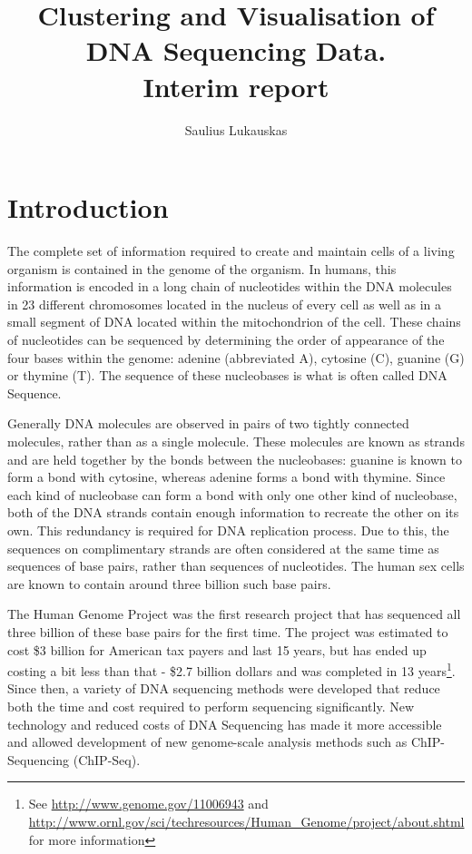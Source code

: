 \documentclass[12pt,a4paper]{article}
\begin{document}
\title{Clustering and Visualisation of DNA Sequencing Data.\\Interim report}
\author{Saulius Lukauskas}
\date{}
\maketitle

\section{Introduction}

The complete set of information required to create and maintain cells of a
living organism is contained in the genome of the organism. In humans, this
information is encoded in a long chain of nucleotides within the DNA molecules
in 23 different chromosomes located in the nucleus of every cell as well as in
a small segment of DNA located within the mitochondrion of the cell.  These
chains of nucleotides can be sequenced by determining the order of appearance
of the four bases within the genome: adenine (abbreviated A), cytosine (C),
guanine (G) or thymine (T). The sequence of these nucleobases is what is often
called DNA Sequence. 

Generally DNA molecules are observed in pairs of two tightly connected
molecules, rather than as a single molecule. These molecules are known as
strands and are held together by the bonds between the nucleobases: guanine is
known to form a bond with cytosine, whereas adenine forms a bond with thymine.
Since each kind of nucleobase can form a bond with only one other kind of
nucleobase, both of the DNA strands contain enough information to recreate the
other on its own. This redundancy is required for DNA replication process. Due
to this, the sequences on complimentary strands are often considered at the
same time as sequences of base pairs, rather than sequences of nucleotides. The
human sex cells are known to contain around three billion such base pairs.

The Human Genome Project was the first research project that has sequenced all
three billion of these base pairs for the first time. The project was estimated
to cost \$3 billion for American tax payers and last 15 years, but has ended up
costing a bit less than that - \$2.7 billion dollars and was completed in 13
years\footnote{See \url{http://www.genome.gov/11006943} and
    \url{http://www.ornl.gov/sci/techresources/Human_Genome/project/about.shtml}
    for more information}. Since then, a variety of DNA sequencing methods were
developed that reduce both the time and cost required to perform sequencing
significantly\cite{Shendure:2008uc,Liu:2012ve}.  New technology and reduced
costs of DNA Sequencing has made it more accessible and allowed
development of new genome-scale analysis methods such as ChIP-Sequencing
(ChIP-Seq).
\end{document}
